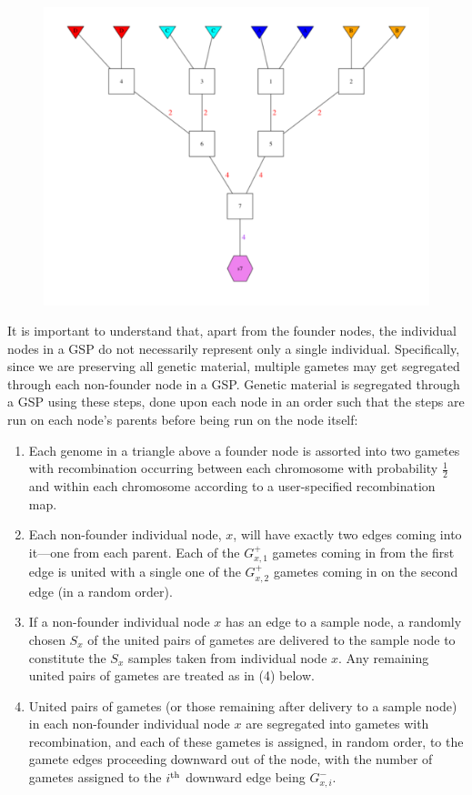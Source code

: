 \begin{figure}
\begin{center}
\includegraphics[width=\columnwidth]{images/gsp4-700.pdf}
\end{center}
\caption[\gspcapone]{\gspcapone}
\label{fig:gsp1}
\end{figure}
It is important to understand that, apart from the founder nodes, the individual
nodes in a GSP do not necessarily represent only a single individual.  Specifically,
since we are preserving all genetic material, multiple gametes may get segregated
through each non-founder node in a GSP.   Genetic material is segregated through
a GSP using these steps, done upon each node in an order such that the steps
are run on each node's parents before being run on the node itself:
\begin{enumerate}
\item Each genome in a triangle above a founder node is assorted into
two gametes with recombination occurring between each chromosome
with probability $\frac{1}{2}$ and within each chromosome according to
a user-specified recombination map.  
\item Each non-founder individual node, $x$, will have exactly two edges coming
into it---one from each parent.  Each of the $G^+_{x,1}$ gametes coming in from the
first edge is united with a single one of the $G^+_{x,2}$ gametes coming
in on the second edge (in a random order). 
\item If a non-founder individual node $x$ has an edge to a sample node,
a randomly chosen $S_x$ of the united pairs of gametes are delivered
to the sample node to constitute the $S_x$ samples taken from individual
node $x$. Any remaining united pairs of gametes are treated as in (4) below.
\item United pairs of gametes (or those remaining after delivery
to a sample node) in each non-founder individual node $x$ are segregated into
gametes with recombination, and each of these gametes is assigned, in
random order, to the gamete edges proceeding downward out of the node,
with the number of gametes assigned to the $i^\mathrm{th}$ downward edge being
$G^-_{x,i}$. 
\end{enumerate}
